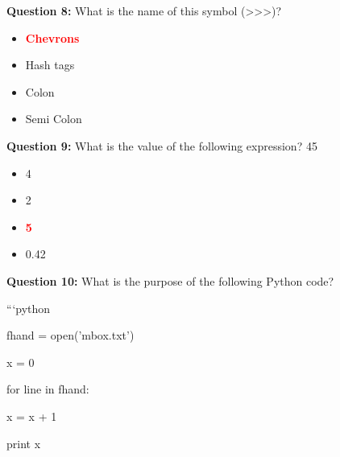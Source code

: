 \documentclass[12pt,a4paper]{article}
\begin{document}
\vspace{0.5cm}

\textbf{Question 8:} What is the name of this symbol (>>>)?

\begin{itemize}
    \item[\textbf{A.}] \textcolor{red}{\textbf{Chevrons}}
    \item[\textbf{B.}] Hash tags
    \item[\textbf{C.}] Colon
    \item[\textbf{D.}] Semi Colon
\end{itemize}

\vspace{0.5cm}

\textbf{Question 9:} What is the value of the following expression? 45 %

\begin{itemize}
    \item[\textbf{A.}] 4
    \item[\textbf{B.}] 2
    \item[\textbf{C.}] \textcolor{red}{\textbf{5}}
    \item[\textbf{D.}] 0.42
\end{itemize}

\vspace{0.5cm}

\textbf{Question 10:} What is the purpose of the following Python code?\newline

\newline
\newline

\newline
```python\newline

\newline
fhand = open('mbox.txt')\newline

\newline
x = 0\newline

\newline
for line in fhand:\newline

\newline
    x = x + 1\newline

\newline
print x\newline
\end{document}
